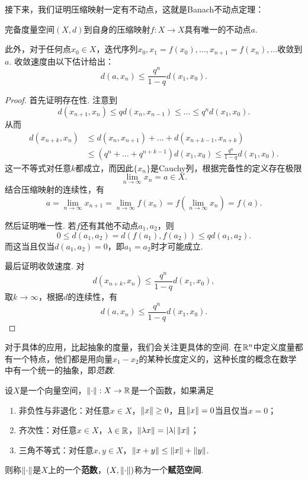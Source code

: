 接下来，我们证明压缩映射一定有不动点，这就是Banach不动点定理：
\begin{theorem}\label{theorem:banach-fixed-point}

完备度量空间$(X,d)$到自身的压缩映射$f:X\to X$具有唯一的不动点$a$. 

此外，对于任何点$x_0\in X$，迭代序列$x_0,x_1=f(x_0),\dots,x_{n+1}=f(x_n),\dots$收敛到$a$. 收敛速度由以下估计给出：
\[d(a,x_n)\leq \frac{q^n}{1-q}d(x_1,x_0).\]
\end{theorem}

\begin{proof}
首先证明存在性. 注意到
\[d(x_{n+1},x_n)\leq qd(x_n,x_{n-1})\leq \dots\leq q^nd(x_1,x_0).\]
从而
\begin{align*}
d(x_{n+k},x_n)&\leq d(x_n,x_{n+1})+\dots+d(x_{n+k-1},x_{n+k})\\
&\leq(q^n+\dots+q^{n+k-1})d(x_1,x_0)\leq \frac{q^{n}}{1-q}d(x_1,x_0).
\end{align*}
这一不等式对任意$k$都成立，而因此$\{x_n\}$是Cauchy列，根据完备性的定义存在极限
\[\lim_{n\to\infty} x_n=a\in X.\]
结合压缩映射的连续性，有
\[a=\lim_{n\to\infty}x_{n+1} = \lim_{n\to\infty}f(x_n)=f\left(\lim_{n\to\infty}x_n\right)=f(a).\]

然后证明唯一性. 若$f$还有其他不动点$a_1,a_2$，则
\[0\leq d(a_1,a_2)=d(f(a_1),f(a_2))\leq qd(a_1,a_2).\]
而这当且仅当$d(a_1,a_2)=0$，即$a_1=a_2$时才可能成立.

最后证明收敛速度. 对
\[d(x_{n+k},x_n)\leq \frac{q^n}{1-q}d(x_1,x_0),\]
取$k\to\infty$，根据$d$的连续性，有
\[d(a,x_n)\leq \frac{q^n}{1-q}d(x_1,x_0).\]
\end{proof}

对于具体的应用，比起抽象的度量，我们会关注更具体的空间. 在$\mathbb{R}^n$中定义度量都有一个特点，他们都是用向量$x_1-x_2$的某种长度定义的，这种长度的概念在数学中有一个统一的抽象，即\textit{范数}. 

\begin{definition}[范数，赋范空间]
设$X$是一个向量空间，$\left\|\cdot\right\|:X\to\mathbb{R}$是一个函数，如果满足
\begin{enumerate}
    \item 非负性与非退化：对任意$x\in X$，$\left\|x\right\|\geq 0$，且$\left\|x\right\|=0$当且仅当$x=0$；
    \item 齐次性：对任意$x\in X$，$\lambda\in\mathbb{R}$，$\left\|\lambda x\right\|=|\lambda|\left\|x\right\|$；
    \item 三角不等式：对任意$x,y\in X$，$\left\|x+y\right\|\leq \left\|x\right\|+\left\|y\right\|$. 
\end{enumerate}
则称$\left\|\cdot\right\|$是$X$上的一个\textbf{范数}，$(X,\left\|\cdot\right\|)$称为一个\textbf{赋范空间}. 
\end{definition}

